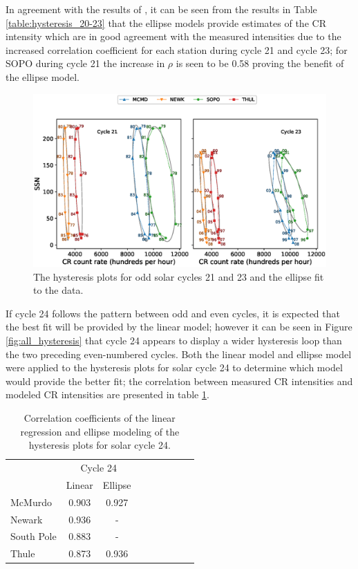 In agreement with the results of \cite{inceoglu_modeling_2014}, it can be seen from the results in Table \ref{table:hysteresis_20-23} that the ellipse models provide estimates of the CR intensity which are in good agreement with the measured intensities due to the increased correlation coefficient for each station during cycle 21 and cycle 23; for SOPO during cycle 21 the increase in $\rho$ is seen to be 0.58 proving the benefit of the ellipse model.

\begin{figure}
	\includegraphics[width=\columnwidth]{ellipse_odd.eps}
	\caption{The hysteresis plots for odd solar cycles 21 and 23 and the ellipse fit to the data.}
	\label{fig:ellipse_odd}
\end{figure}

If cycle 24 follows the pattern between odd and even cycles, it is expected that the best fit will be provided by the linear model; however it can be seen in Figure \ref{fig:all_hysteresis} that cycle 24 appears to display a wider hysteresis loop than the two preceding even-numbered cycles. Both the linear model and ellipse model were applied to the hysteresis plots for solar cycle 24 to determine which model would provide the better fit; the correlation between measured CR intensities and modeled CR intensities are presented in table \ref{table:hysteresis_24}.

\begin{table}[!ht]
	\begin{center}
	\caption{Correlation coefficients of the linear regression and ellipse modeling of the hysteresis plots for solar cycle 24.}
	\label{table:hysteresis_24}
	\begin{tabular}{l c c c c c c c c}
		\hline 
		{} & \multicolumn{2}{c}{Cycle 24} \\
		{} & {Linear} & {Ellipse} \\ \hline
		{McMurdo} & {0.903} & {0.927} \\
		{Newark} & {0.936} & {-} \\
		{South Pole} & {0.883} & {-} \\
		{Thule} & {0.873} & {0.936} \\ \hline
	\end{tabular}
	\end{center}
\end{table}

